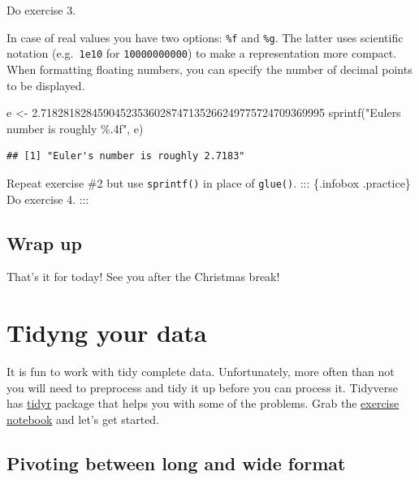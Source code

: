 \documentclass[
]{book}
\newenvironment{Shaded}{\begin{snugshade}}{\end{snugshade}}
\newcommand{\FloatTok}[1]{\textcolor[rgb]{0.00,0.00,0.81}{#1}}
\newcommand{\FunctionTok}[1]{\textcolor[rgb]{0.00,0.00,0.00}{#1}}
\newcommand{\NormalTok}[1]{#1}
\newcommand{\OtherTok}[1]{\textcolor[rgb]{0.56,0.35,0.01}{#1}}
\newcommand{\StringTok}[1]{\textcolor[rgb]{0.31,0.60,0.02}{#1}}
\begin{document}
Do exercise 3.

In case of real values you have two options: \texttt{\%f} and \texttt{\%g}. The latter uses scientific notation (e.g.~\texttt{1e10} for \texttt{10000000000}) to make a representation more compact. When formatting floating numbers, you can specify the number of decimal points to be displayed.

\begin{Shaded}
\begin{Highlighting}[]
\NormalTok{e }\OtherTok{\textless{}{-}} \FloatTok{2.71828182845904523536028747135266249775724709369995}
\FunctionTok{sprintf}\NormalTok{(}\StringTok{"Euler\textquotesingle{}s number is roughly \%.4f"}\NormalTok{, e)}
\end{Highlighting}
\end{Shaded}

\begin{verbatim}
## [1] "Euler's number is roughly 2.7183"
\end{verbatim}

Repeat exercise \#2 but use \texttt{sprintf()} in place of \texttt{glue()}.
::: \{.infobox .practice\}
Do exercise 4.
:::

\hypertarget{wrap-up-2}{%
\section{Wrap up}\label{wrap-up-2}}

That's it for today! See you after the Christmas break!

\hypertarget{seminar09}{%
\chapter{Tidyng your data}\label{seminar09}}

It is fun to work with tidy complete data. Unfortunately, more often than not you will need to preprocess and tidy it up before you can process it. Tidyverse has \href{https://tidyr.tidyverse.org/}{tidyr} package that helps you with some of the problems. Grab the \href{notebooks/Seminar\%2009\%20-\%20tidyr.Rmd}{exercise notebook} and let's get started.

\hypertarget{pivoting-between-long-and-wide-format}{%
\section{Pivoting between long and wide format}\label{pivoting-between-long-and-wide-format}}
\end{document}
